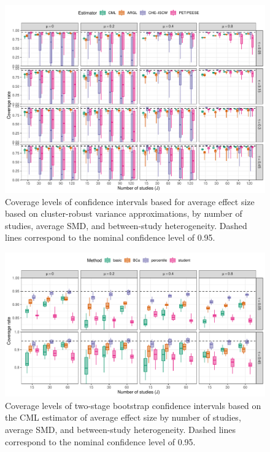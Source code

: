 \documentclass[
  american,
  man, donotrepeattitle,floatsintext]{apa7}
\begin{document}
\begin{figure}
\includegraphics{step-function-selection-models-with-dependent-effects_files/figure-latex/comparison-coverage-full-1} \caption{Coverage levels of confidence intervals based for average effect size based on cluster-robust variance approximations, by number of studies, average SMD, and between-study heterogeneity. Dashed lines correspond to the nominal confidence level of 0.95.}\label{fig:comparison-coverage-full}
\end{figure}

\begin{figure}
\includegraphics{step-function-selection-models-with-dependent-effects_files/figure-latex/CML-coverage-two-stage-1} \caption{Coverage levels of two-stage bootstrap confidence intervals based on the CML estimator of average effect size by number of studies, average SMD, and between-study heterogeneity. Dashed lines correspond to the nominal confidence level of 0.95.}\label{fig:CML-coverage-two-stage}
\end{figure}
\end{document}
